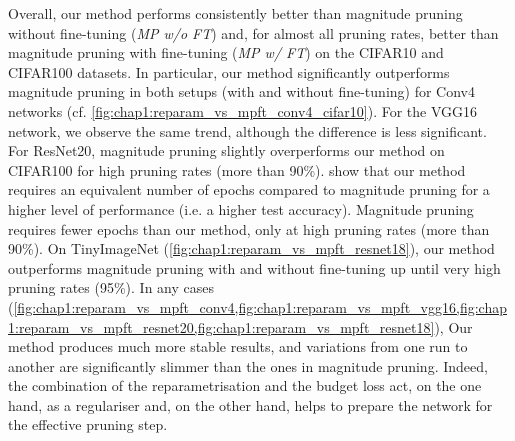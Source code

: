 Overall, our method performs consistently better than magnitude pruning without
fine-tuning (\emph{MP w/o FT}) and, for almost all pruning rates, better than
magnitude pruning with fine-tuning (\emph{MP w/ FT}) on the CIFAR10 and CIFAR100
datasets. In particular, our method significantly outperforms magnitude pruning
in both setups (with and without fine-tuning) for Conv4 networks (cf.
\cref{fig:chap1:reparam_vs_mpft_conv4_cifar10}). For the VGG16 network, we
observe the same trend, although the difference is less significant. For
ResNet20, magnitude pruning slightly overperforms our method on CIFAR100 for
high pruning rates (more than 90\%).
show that our method requires an equivalent number of epochs compared to
magnitude pruning for a higher level of performance (i.e. a higher test
accuracy). Magnitude pruning requires fewer epochs than our method, only at high
pruning rates (more than 90\%). On TinyImageNet
(\cref{fig:chap1:reparam_vs_mpft_resnet18}), our method outperforms magnitude
pruning with and without fine-tuning up until very high pruning rates (95\%). In
any cases
(\cref{fig:chap1:reparam_vs_mpft_conv4,fig:chap1:reparam_vs_mpft_vgg16,fig:chap1:reparam_vs_mpft_resnet20,fig:chap1:reparam_vs_mpft_resnet18}),
Our method produces much more stable results, and variations from one run to
another are significantly slimmer than the ones in magnitude pruning. Indeed,
the combination of the reparametrisation and the budget loss act, on the one
hand, as a regulariser and, on the other hand, helps to prepare the network for
the effective pruning step.\\

